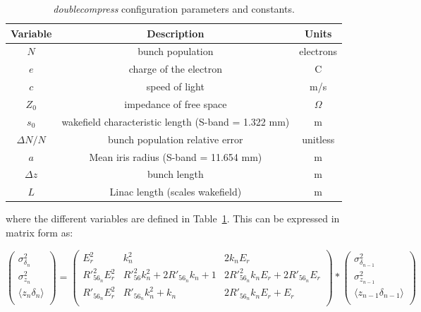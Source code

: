 \documentclass[a4paper,12pt]{article}
\begin{document}
\begin{table}
  \begin{center}
    \begin{tabular}{|c| c |c|}
      \hline
      \textbf{Variable} & \textbf{Description} & \textbf{Units} \\ [0.5ex]
      \hline\hline
      $N$ & bunch population & electrons \\
      \hline
      $e$ & charge of the electron & C \\
      \hline
      $c$ & speed of light & m/s \\
      \hline
      $Z_0$ & impedance of free space & $\Omega$ \\
      \hline
      $s_0$ &  wakefield characteristic length (S-band = 1.322 mm) & m \\
      \hline
      $\Delta N/N$ & bunch population relative error & unitless \\
      \hline
      $a$ & Mean iris radius (S-band = 11.654 mm) & m \\
      \hline
      $\Delta z$ & bunch length & m \\
      \hline
      $L$ & Linac length (scales wakefield) & m \\ %
      \hline
    \end{tabular}
    \caption{\emph{doublecompress} configuration parameters and constants.}
    \label{tbl:dc_params}
  \end{center}
\end{table}

\noindent where the different variables are defined in Table~\ref{tbl:dc_params}. This can be expressed in matrix form as:

\begin{equation}
\begin{pmatrix}\sigma^2_{\delta_{n}} \\ \sigma^2_{z_{n}} \\ \langle z_{n}\delta_{n}\rangle\\ \end{pmatrix}=\begin{pmatrix}
E_{r}^2 & k^2_n & 2 k_n E_{r} \\
R'^2_{56_n} E_{r}^2 & R'^2 _{56} k^2_n+2 R'_{56_n} k_n+1 & 2 R'^2_{56_n} k_n E_{r}+2 R'_{56_n} E_{r}\\ R'_{56_n} E_{r}^2 & R'_{56_n} k^2_n+k_n & 2 R'_{56_n} k_n E_{r}+E_{r} \\
 \end{pmatrix} *\begin{pmatrix}\sigma^2_{\delta_{n-1}} \\ \sigma^2_{z_{n-1}} \\ \langle z_{n-1}\delta_{n-1}\rangle\\ \end{pmatrix}
 \label{eq:doublecompress}
\end{equation}
\end{document}
